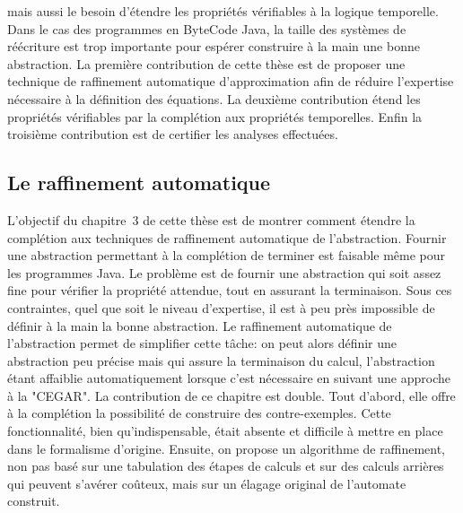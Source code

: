 mais aussi le besoin d'étendre les propriétés vérifiables à la logique temporelle.
Dans le cas des programmes en ByteCode Java, la taille des systèmes de réécriture est trop importante
pour espérer construire à la main une bonne abstraction. La première contribution de cette thèse est de
proposer une technique de raffinement automatique d'approximation
afin de réduire l'expertise nécessaire à la définition des équations.
La deuxième contribution étend les propriétés vérifiables par la complétion aux propriétés temporelles.
Enfin la troisième contribution est de certifier les analyses effectuées.



\bigskip
\subsection*{Le raffinement automatique} 
L'objectif du chapitre~3 de cette thèse est de montrer comment étendre la complétion
aux techniques de raffinement automatique de l'abstraction. Fournir une abstraction permettant à la complétion
de terminer est faisable même pour les programmes Java. Le problème est de fournir une abstraction qui soit assez
fine pour vérifier la propriété attendue, tout en assurant la terminaison. Sous ces contraintes, quel que soit
le niveau d'expertise, il est à peu près impossible de définir à la main la bonne abstraction. Le raffinement automatique
de l'abstraction permet de simplifier cette tâche: on peut alors définir une abstraction peu précise mais qui assure
la terminaison du calcul, l'abstraction étant affaiblie automatiquement lorsque c'est nécessaire en suivant une approche à la "CEGAR".
La contribution de ce chapitre est double. Tout d'abord, elle offre à la complétion la possibilité de
construire des contre-exemples. Cette fonctionnalité, bien qu'indispensable, était absente et difficile à mettre
en place dans le formalisme d'origine. Ensuite, on propose un algorithme de raffinement, non pas basé 
sur une tabulation des étapes de calculs et sur des calculs arrières qui peuvent s'avérer coûteux, mais sur un élagage 
original de l'automate construit. 

